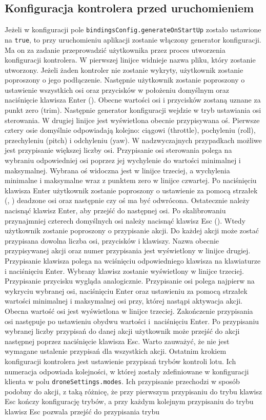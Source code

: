 \subsection{Konfiguracja kontrolera przed uruchomieniem}

Jeżeli w konfiguracji pole \texttt{bindingsConfig.generateOnStartUp} zostało ustawione na \texttt{true}, to przy uruchomieniu aplikacji zostanie włączony generator konfiguracji. Ma on za zadanie przeprowadzić użytkownika przez proces utworzenia konfiguracji kontrolera. W pierwszej linijce widnieje nazwa pliku, który zostanie utworzony. Jeżeli żaden kontroler nie zostanie wykryty, użytkownik zostanie poproszony o jego podłączenie. Następnie użytkownik zostanie poproszony o ustawienie wszystkich osi oraz przycisków w położeniu domyślnym oraz naciśnięcie klawisza Enter (\keys{\return}). Obecne wartości osi i przycisków zostaną uznane za punkt zero (trim). Następnie generator konfiguracji wejdzie w tryb ustawiania osi sterowania. W drugiej linijce jest wyświetlona obecnie przypisywana oś. Pierwsze cztery osie domyślnie odpowiadają kolejno: ciągowi (throttle), pochyleniu (roll), przechyleniu (pitch) i odchyleniu (yaw). W nadzwyczajnych przypadkach możliwe jest przypisanie większej liczby osi. Przypisanie osi sterowania polega na wybraniu odpowiedniej osi poprzez jej wychylenie do wartości minimalnej i maksymalnej. Wybrana oś widoczna jest w linijce trzeciej, a wychylenia minimalne i maksymalne wraz z punktem zero w linijce czwartej. Po naciśnięciu klawisza Enter użytkownik zostanie poproszony o ustawienie za pomocą strzałek (\keys{\ \arrowkeyleft}, \keys{\arrowkeyright}) deadzone osi oraz następnie czy oś ma być odwrócona. Ostatecznie należy nacisnąć klawisz Enter, aby przejść do następnej osi. Po skalibrowaniu przynajmniej czterech domyślnych osi należy nacisnąć klawisz Esc (\keys{\esc}). Wtedy użytkownik zostanie poproszony o przypisanie akcji. Do każdej akcji może zostać przypisana dowolna liczba osi, przycisków i klawiszy. Nazwa obecnie przypisywanej akcji oraz numer przypisania jest wyświetlony w linijce drugiej. Przypisanie klawisza polega na wciśnięciu odpowiedniego klawisza na klawiaturze i naciśnięciu Enter. Wybrany klawisz zostanie wyświetlony w linijce trzeciej. Przypisanie przycisku wygląda analogicznie. Przypisanie osi polega najpierw na wykryciu wybranej osi, naciśnięciu Enter oraz ustawieniu za pomocą strzałek wartości minimalnej i maksymalnej osi przy, której nastąpi aktywacja akcji. Obecna wartość osi jest wyświetlona w linijce trzeciej. Zakończenie przypisania osi następuje po ustawieniu obydwu wartości i~naciśnięciu Enter. Po przypisaniu wybranej liczby przypisań do danej akcji użytkownik może przejść do akcji następnej poprzez naciśnięcie klawisza Esc. Warto zauważyć, że nie jest wymagane ustalenie przypisań dla wszystkich akcji. Ostatnim krokiem konfiguracji kontrolera jest ustawienie przypisań trybów kontroli lotu. Ich numeracja odpowiada kolejności, w której zostały zdefiniowane w konfiguracji klienta w polu \texttt{droneSettings.modes}. Ich przypisanie przechodzi w sposób podobny do akcji, z taką różnicę, że przy pierwszym przypisaniu do trybu klawisz Esc kończy konfigurację trybów, a przy każdym kolejnym przypisaniu do trybu klawisz Esc pozwala przejść do przypisania trybu 